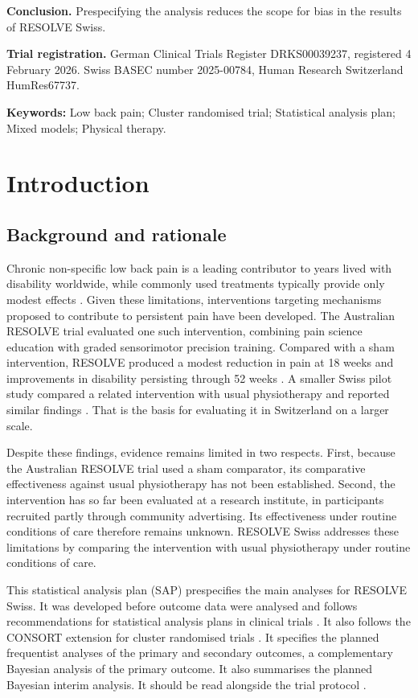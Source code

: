 \documentclass[11pt,a4paper]{article}
\begin{document}
\textbf{Conclusion.} Prespecifying the analysis reduces the scope for bias in
the results of RESOLVE Swiss.

\textbf{Trial registration.} German Clinical Trials Register DRKS00039237,
registered 4 February 2026. Swiss BASEC number 2025-00784, Human Research
Switzerland HumRes67737.

\vspace{0.4em}
\noindent\textbf{Keywords:} Low back pain; Cluster randomised trial;
Statistical analysis plan; Mixed models; Physical therapy.

\section{Introduction}

\subsection{Background and rationale}
Chronic non-specific low back pain is a leading contributor to years lived
with disability worldwide, while commonly used treatments typically provide
only modest effects \citep{wand2008}. Given these limitations, interventions
targeting mechanisms proposed to contribute to persistent pain have been
developed. The Australian RESOLVE trial evaluated one such intervention,
combining pain science education with graded sensorimotor precision training.
Compared with a sham intervention, RESOLVE produced a modest reduction in pain
at 18 weeks and improvements in disability persisting through 52 weeks
\citep{bagg2022}. A smaller Swiss pilot study compared a related intervention
with usual physiotherapy and reported similar findings \citep{waelti2015}.
That is the basis for evaluating it in Switzerland on a larger scale.

Despite these findings, evidence remains limited in two respects. First,
because the Australian RESOLVE trial used a sham comparator, its comparative
effectiveness against usual physiotherapy has not been established. Second,
the intervention has so far been evaluated at a research institute, in
participants recruited partly through community advertising. Its
effectiveness under routine conditions of care therefore remains unknown.
RESOLVE Swiss addresses these limitations by comparing the intervention with
usual physiotherapy under routine conditions of care.

This statistical analysis plan (SAP) prespecifies the main analyses for
RESOLVE Swiss. It was developed before outcome data were analysed and follows
recommendations for statistical analysis plans in clinical trials
\citep{gamble2017}. It also follows the CONSORT extension for cluster
randomised trials \citep{campbell2012}. It specifies the planned frequentist
analyses of the primary and secondary outcomes, a complementary Bayesian
analysis of the primary outcome. It also summarises the planned Bayesian
interim analysis. It should be read alongside the trial protocol
\citep{wirz2026}.
\end{document}
